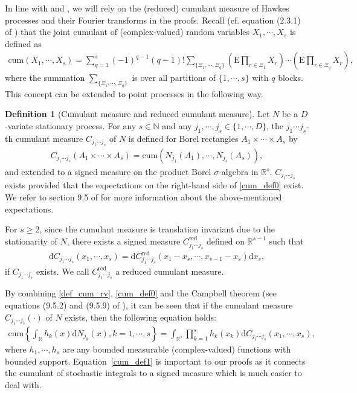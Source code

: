 \documentclass[11pt]{article}
\numberwithin{equation}{section}
\theoremstyle{plain}
\theoremstyle{definition}
\theoremstyle{definition}
\newtheorem{definition}{Definition}
\theoremstyle{assumption}
\theoremstyle{proposition}
\theoremstyle{proposition}
\theoremstyle{example}
\theoremstyle{lemma}
\theoremstyle{theorem}
\theoremstyle{remark}
\begin{document}
In line with \citet{Brillinger1972} and \citet{Tuan1981}, we will rely on the (reduced) cumulant measure of Hawkes processes and their Fourier transforms in the proofs. Recall (cf. equation (2.3.1) of \citet{Brillinger2001}) that the joint cumulant of (complex-valued) random variables $X_1,\cdots,X_s$ is defined as
\begin{align}\label{def_cum_rv}
\mathrm{cum}(X_1,\cdots,X_s)
=\sum_{q=1}^s (-1)^{q-1}(q-1)!\sum_{\{\Xi_{1},\cdots,\Xi_{q}\}}\left(\mathrm{E}\prod_{r\in \Xi_{1}}X_{r}\right)\cdots\left(\mathrm{E}\prod_{r\in \Xi_{q}}X_{r}\right),    
\end{align}
where the summation $\sum_{\{\Xi_{1},\cdots,\Xi_{q}\}}$ is over all partitions of $\{1,\cdots,s\}$ with $q$ blocks. This concept can be extended to point processes in the following way.
\begin{definition}[Cumulant measure and reduced cumulant measure]\label{HPCum_def}
Let $N$ be a $D$-variate stationary process. For any $s\in\mathbb{N}$ and any $j_1,\cdots,j_s\in\{1,\cdots,D\}$, the $j_1\cdots j_s$-th cumulant measure $C_{j_1\cdots j_s}$ of $N$ is defined for Borel rectangles $A_1\times\cdots\times A_s$ by 
\begin{align}\label{cum_def0}
C_{j_1\cdots j_s}(A_1\times\cdots\times A_s)
=\mathrm{cum}(N_{j_1}(A_1),\cdots,N_{j_s}(A_s)),
\end{align}
and extended to a signed measure on the product Borel $\sigma$-algebra in $\mathbb{R}^{s}$. $C_{j_1\cdots j_s}$ exists provided that the expectations on the right-hand side of \eqref{cum_def0} exist. We refer to section 9.5 of \citet{Daley_and_Vere-Jones2008_volume2} for more information about the above-mentioned expectations.

For $s\geqslant2$, since the cumulant measure is translation invariant due to the stationarity of $N$, there exists a signed measure $C_{j_1\cdots j_s}^{\mathrm{red}}$ defined on $\mathbb{R}^{s-1}$ such that
\begin{align*}
\mathrm{d}C_{j_1\cdots j_s}(x_1,\cdots,x_s)=\mathrm{d}C_{j_1\cdots j_s}^{\mathrm{red}}(x_1 - x_s,\cdots,x_{s-1} - x_s)\mathrm{d}x_s,
\end{align*}
if ${C}_{j_1\cdots j_s}$ exists. We call $C_{j_1\cdots j_s}^{\mathrm{red}}$ a reduced cumulant measure.
\end{definition}

By combining \eqref{def_cum_rv}, \eqref{cum_def0} and the Campbell theorem (see equations (9.5.2) and (9.5.9) of \citet{Daley_and_Vere-Jones2008_volume2}), it can be seen that if the cumulant measure $C_{j_1\cdots j_s}(\cdot)$ of $N$ exists, then the following equation holds:
\begin{align}\label{cum_def1}
\mathrm{cum}\left\{\int_{\mathbb{R}}h_{k}(x)\mathrm{d}N_{j_k}(x),k=1,\cdots,s\right\} = \int_{\mathbb{R}^s}\prod_{k=1}^{s}h_{k}(x_k)\mathrm{d}C_{j_1\cdots j_s}(x_1,\cdots,x_{s}),
\end{align}
where $h_1,\cdots,h_s$ are any bounded measurable (complex-valued) functions with bounded support. Equation~\eqref{cum_def1} is important to our proofs as it connects the cumulant of stochastic integrals to a signed measure which is much easier to deal with.
\end{document}
